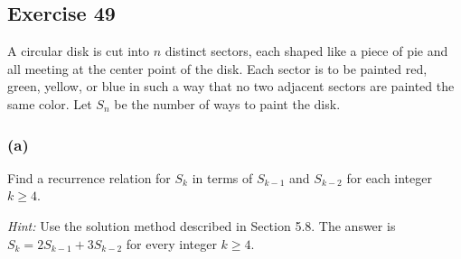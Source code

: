 \documentclass[14pt]{extarticle}
\begin{document}
\subsection{Exercise 49}
A circular disk is cut into $n$ distinct sectors, each shaped like a piece of pie and all meeting at the center
point of the disk. Each sector is to be painted red, green, yellow, or blue in such a way that no two adjacent sectors
are painted the same color. Let \(S_n\) be the number of ways to paint the disk.

\subsubsection{(a)}
Find a recurrence relation for \(S_k\) in terms of \(S_{k-1}\) and \(S_{k-2}\) for each integer \(k \geq 4\).

     {\it Hint:} Use the solution method described in Section 5.8. The answer is \(S_k = 2S_{k-1} + 3S_{k-2}\) for every
integer \(k \geq 4\).
\end{document}
